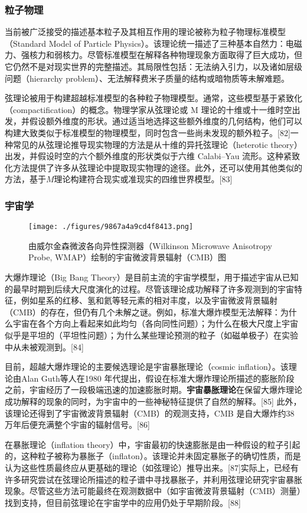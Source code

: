 \subsubsection{粒子物理}
当前被广泛接受的描述基本粒子及其相互作用的理论被称为粒子物理标准模型（Standard Model of Particle Physics）。该理论统一描述了三种基本自然力：电磁力、强核力和弱核力。尽管标准模型在解释各种物理现象方面取得了巨大成功，但它仍然不是对现实世界的完整描述。其局限性包括：无法纳入引力，以及诸如层级问题（hierarchy problem）、无法解释费米子质量的结构或暗物质等未解难题。

弦理论被用于构建超越标准模型的各种粒子物理模型。通常，这些模型基于紧致化（compactification）的概念。物理学家从弦理论或 M 理论的十维或十一维时空出发，并假设额外维度的形状。通过适当地选择这些额外维度的几何结构，他们可以构建大致类似于标准模型的物理模型，同时包含一些尚未发现的额外粒子。[82]一种常见的从弦理论推导现实物理的方法是从十维的异托弦理论（heterotic theory）出发，并假设时空的六个额外维度的形状类似于六维 Calabi–Yau 流形。这种紧致化方法提供了许多从弦理论中提取现实物理的途径。此外，还可以使用其他类似的方法，基于\(M\)理论构建符合现实或准现实的四维世界模型。[83]
\subsubsection{宇宙学}
\begin{figure}[ht]
\centering
\texttt{[image: ./figures/9867a4a9cd4f8413.png]}
\caption{由威尔金森微波各向异性探测器（Wilkinson Microwave Anisotropy Probe, WMAP）绘制的宇宙微波背景辐射（CMB）图} \label{fig_String_10}
\end{figure} 
大爆炸理论（Big Bang Theory）是目前主流的宇宙学模型，用于描述宇宙从已知的最早时期到后续大尺度演化的过程。尽管该理论成功解释了许多观测到的宇宙特征，例如星系的红移、氢和氦等轻元素的相对丰度，以及宇宙微波背景辐射（CMB）的存在，但仍有几个未解之谜。例如，标准大爆炸模型无法解释：为什么宇宙在各个方向上看起来如此均匀（各向同性问题）；为什么在极大尺度上宇宙似乎是平坦的（平坦性问题）；为什么某些理论预测的粒子（如磁单极子）在实验中从未被观测到。[84]

目前，超越大爆炸理论的主要候选理论是宇宙暴胀理论（cosmic inflation）。该理论由Alan Guth等人在1980 年代提出，假设在标准大爆炸理论所描述的膨胀阶段之前，宇宙经历了一段极端迅速的加速膨胀时期。\textbf{宇宙暴胀理论}在保留大爆炸理论成功解释的现象的同时，为宇宙中的一些神秘特征提供了自然的解释。[85] 此外，该理论还得到了宇宙微波背景辐射（CMB）的观测支持，CMB 是自大爆炸约38 万年后便充满整个宇宙的辐射信号。[86]

在暴胀理论（inflation theory）中，宇宙最初的快速膨胀是由一种假设的粒子引起的，这种粒子被称为暴胀子（inflaton）。该理论并未固定暴胀子的确切性质，而是认为这些性质最终应从更基础的理论（如弦理论）推导出来。[87]实际上，已经有许多研究尝试在弦理论所描述的粒子谱中寻找暴胀子，并利用弦理论研究宇宙暴胀现象。尽管这些方法可能最终在观测数据中（如宇宙微波背景辐射（CMB）测量）找到支持，但目前弦理论在宇宙学中的应用仍处于早期阶段。[88]
